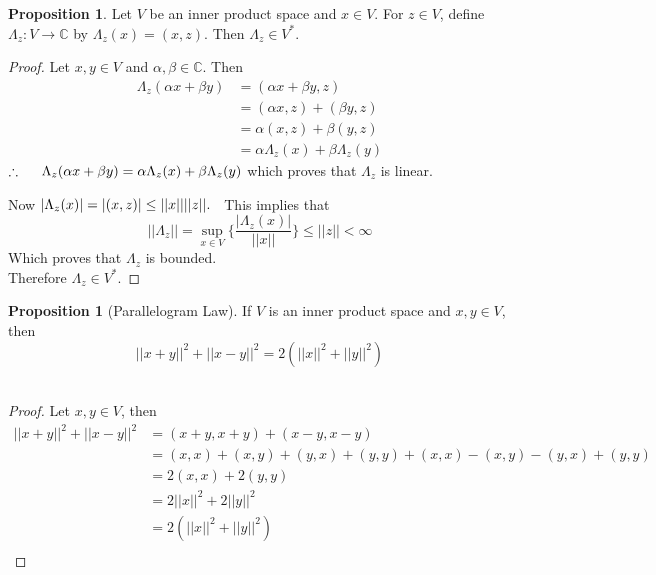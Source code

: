 \documentclass[11pt,a4paper]{article}
\theoremstyle{definition}
\newtheorem{prop}[thm]{Proposition}
\begin{document}
\begin{prop}
Let $V$ be an inner product space and $x\in V$. For $z\in V$, define $\Lambda_z:V\rightarrow \mathbb{C}$ by $\Lambda_z(x)=(x,z)$. Then $\Lambda_z\in V^*$.

\end{prop}

\begin{proof}
Let $x,y\in V$ and $\alpha, \beta \in \mathbb{C}$. Then 
\begin{align*}
\Lambda_z(\alpha x+\beta y) &=(\alpha x+\beta y,z)\\
                            &=(\alpha x,z)+(\beta y,z)\\
                            &=\alpha(x,z)+\beta(y,z)\\
                            &=\alpha \Lambda_z(x)+\beta \Lambda_z(y)
\end{align*}
$\therefore\hspace{0.5cm} \Lambda_z(\alpha x+\beta y)=\alpha \Lambda_z(x)+\beta \Lambda_z(y)$ which proves that $\Lambda_z$ is linear.

Now \hspace{0.2cm}$|\Lambda_z(x)|=|(x,z)|\leq ||x||||z||.\hspace{0.2cm}$ This implies that $$||\Lambda_z||=\sup_{x\in V}\Bigg\{\frac{|\Lambda_z(x)|}{||x||}\Bigg\}\leq ||z||<\infty$$ Which proves that $\Lambda_z$ is bounded.\\
Therefore $\Lambda_z\in V^*$.

\end{proof}

\begin{prop}[Parallelogram Law]
If $V$ is an inner product space and $x,y\in V$, then $$||x+y||^2+||x-y||^2=2(||x||^2+||y||^2)$$\\


\pagebreak
\end{prop}
\begin{proof}
Let $x,y\in V$, then
\begin{align*}
||x+y||^2+||x-y||^2 &=(x+y,x+y)+(x-y,x-y)\\
                    &=(x,x)+(x,y)+(y,x)+(y,y)+(x,x)-(x,y)-(y,x)+(y,y)\\
                    &=2(x,x)+2(y,y)\\
                    &=2||x||^2+2||y||^2\\
                    &=2(||x||^2+||y||^2)\\
\end{align*}
\end{proof}
\end{document}
